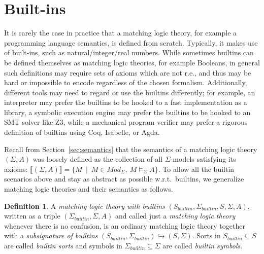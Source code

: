 \documentclass[UTF8,11pt]{article}
\newcounter{thmcounter}
\theoremstyle{plain}
\theoremstyle{definition}
\newtheorem{definition} [thmcounter]{Definition}
\theoremstyle{remark}
\newcommand{\parametric}[2]{{#1}\raisebox{.2ex}{\texttt{\footnotesize{\{}}}#2\raisebox{.2ex}{\texttt{\footnotesize{\}}}}}
\newcommand{\Mod}{\textit{Mod}}
\newcommand{\denote}[1]{\llbracket{#1}\rrbracket}
\newcommand{\builtin}{\textit{builtin}}
\newcommand{\inj}[2]{\parametric{\mathit{inj}}{#1, #2}}
\begin{document}
%
%


\section{Built-ins}
\label{sec:builtins}

It is rarely the case in practice that a matching logic theory, for example
a programming language semantics, is defined from scratch.
Typically, it makes use of built-ins, such as natural/integer/real numbers.
While sometimes builtins can be defined themselves as matching logic theories,
for example Booleans, in general such definitions may require sets of axioms
which are not r.e., and thus may be hard or impossible to encode regardless
of the chosen formalism.
Additionally, different tools may need to regard or use the builtins
differently;
for example, an interpreter may prefer the builtins to be hooked to a
fast implementation as a library, a symbolic execution engine may prefer the
builtins to be hooked to an SMT solver like Z3, while a mechanical program
verifier may prefer a rigorous definition of builtins using Coq, Isabelle,
or Agda.

Recall from Section~\ref{sec:semantics} that the semantics of a matching
logic theory $(\Sigma,A)$ was loosely defined as the collection of all
$\Sigma$-models satisfying its axioms: $\denote{(\Sigma,A)} =
\{M \ \mid \ M \in \Mod_{\Sigma},\ M \models_{\Sigma} A \}$.
To allow all the builtin scenarios above and stay as abstract as possible
w.r.t.~builtins, we generalize matching logic theories and their semantics
as follows.

\begin{definition}
A \emph{matching logic theory with builtins}
$(S_\builtin,\Sigma_\builtin,S,\Sigma,A)$, written as a triple
$(\Sigma_\builtin,\Sigma,A)$ and
called just a \emph{matching logic theory} whenever there is no confusion,
is an ordinary matching logic theory together with a
\emph{subsignature of builtins}
$(S_\builtin,\Sigma_\builtin)\hookrightarrow(S,\Sigma)$.
Sorts in $S_\builtin \subseteq S$ are called \emph{builtin sorts} and symbols in
$\Sigma_\builtin \subseteq \Sigma$ are called \emph{builtin symbols}.
\end{definition}
\end{document}

